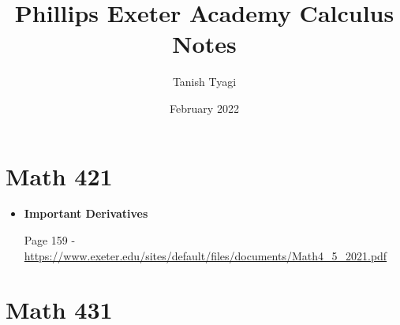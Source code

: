 \documentclass{article}
\title{Phillips Exeter Academy Calculus Notes}
\author{Tanish Tyagi}
\date{February 2022}
\begin{document}
\maketitle

\section{Math 421}

\begin{itemize}
    \item \textbf{Important Derivatives}
    
    Page 159 - \url{https://www.exeter.edu/sites/default/files/documents/Math4_5_2021.pdf}
\end{itemize}

\section{Math 431}
\end{document}
